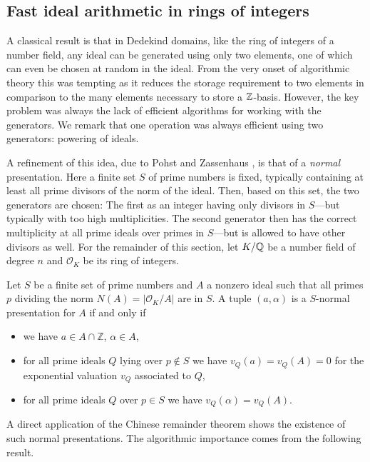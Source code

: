 \documentclass{sig-alternate-05-2015}
\begin{document}
\subsection{Fast ideal arithmetic in rings of integers}

A classical result is that in Dedekind domains, like the ring of integers of a number field, any
ideal can be generated using only two elements, one of which can even be chosen
at random in the ideal. From the very onset of algorithmic theory this was
tempting as it reduces the storage requirement to two elements in comparison to the many elements necessary to
store a $\mathbb{Z}$-basis. However, the key problem was always the lack of
efficient algorithms for working with the generators. We remark that one
operation was always efficient using two generators: powering of ideals.

A refinement of this idea, due to Pohst and Zassenhaus \cite[p. 400]{Pohst1997}, is that
of a \textit{normal} presentation. Here a finite set $S$ of prime numbers
is fixed, typically containing at least all prime divisors of the norm of the ideal. Then,
based on this set, the two generators are chosen: The first as an integer
having only divisors in $S$---but typically with too high multiplicities.
The second generator then has the correct multiplicity at all prime ideals
over primes in $S$---but is allowed to have other divisors as well.
For the remainder of this section, let $K/\mathbb{Q}$ be a number field of
degree $n$ and $\mathcal O_K$ be its ring of integers.

\begin{definition}
Let $S$ be a finite set of prime numbers and $A$ a nonzero ideal such that
all primes $p$ dividing the norm $N(A) = |\mathcal O_K/A|$ are in $S$.
A tuple $(a, \alpha)$ is a $S$-normal presentation for $A$ if and only if
\begin{itemize}
\item we have $a\in A\cap \mathbb Z$, $\alpha\in A$,
\item for all prime ideals $Q$ lying over $p\not\in S$ we have $v_Q(a)= v_Q(A) = 0$
  for the exponential valuation $v_Q$ associated to $Q$,
\item for all prime ideals $Q$ over $p\in S$ we have $v_Q(\alpha) = v_Q(A)$.
\end{itemize}
\end{definition}

A direct application of the Chinese remainder theorem shows the existence of such normal presentations.
The algorithmic importance comes from the following result.
\end{document}
